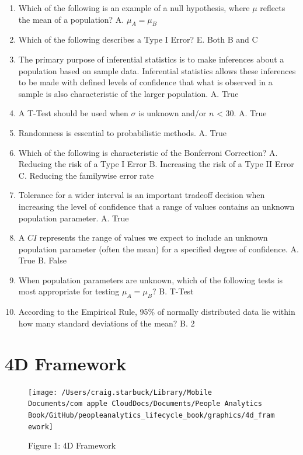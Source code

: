 \documentclass[]{book}
\begin{document}
\begin{enumerate}
\def\labelenumi{\arabic{enumi}.}
\item
  Which of the following is an example of a null hypothesis, where \(\mu\) reflects the mean of a population?
  A. \(\mu_A = \mu_B\)
\item
  Which of the following describes a Type I Error?
  E. Both B and C
\item
  The primary purpose of inferential statistics is to make inferences about a population based on sample data. Inferential statistics allows these inferences to be made with defined levels of confidence that what is observed in a sample is also characteristic of the larger population.
  A. True
\item
  A T-Test should be used when \(\sigma\) is unknown and/or \(n\) \textless{} 30.
  A. True
\item
  Randomness is essential to probabilistic methods.
  A. True
\item
  Which of the following is characteristic of the Bonferroni Correction?
  A. Reducing the risk of a Type I Error
  B. Increasing the risk of a Type II Error
  C. Reducing the familywise error rate
\item
  Tolerance for a wider interval is an important tradeoff decision when increasing the level of confidence that a range of values contains an unknown population parameter.
  A. True
\item
  A \(CI\) represents the range of values we expect to include an unknown population parameter (often the mean) for a specified degree of confidence.
  A. True
  B. False
\item
  When population parameters are unknown, which of the following tests is most appropriate for testing \(\mu_A = \mu_B\)?
  B. T-Test
\item
  According to the Empirical Rule, 95\% of normally distributed data lie within how many standard deviations of the mean?
  B. 2
\end{enumerate}

\hypertarget{d-framework-1}{%
\section{4D Framework}\label{d-framework-1}}

\begin{figure}
\texttt{[image: /Users/craig.starbuck/Library/Mobile Documents/com~apple~CloudDocs/Documents/People Analytics Book/GitHub/peopleanalytics\_lifecycle\_book/graphics/4d\_framework]} \caption{Figure 1: 4D Framework}\label{fig:4d-overview}
\end{figure}
\end{document}
